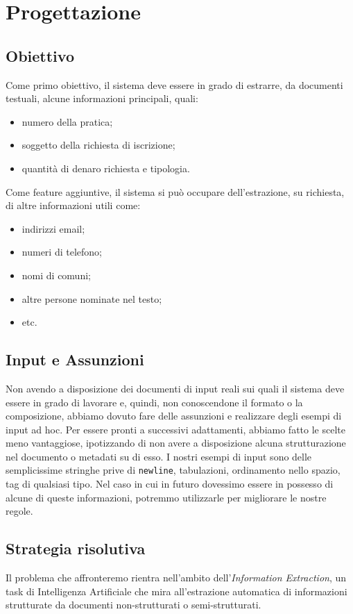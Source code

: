 \section{Progettazione}

\subsection{Obiettivo}
Come primo obiettivo, il sistema deve essere in grado di estrarre, da documenti testuali, alcune informazioni principali, quali:
\begin{itemize}
\item numero della pratica; %
\item soggetto della richiesta di iscrizione;
\item quantità di denaro richiesta e tipologia.
\end{itemize}

Come feature aggiuntive, il sistema si può occupare dell'estrazione, su richiesta, di altre informazioni utili come:
\begin{itemize}
\item indirizzi email;
\item numeri di telefono;
\item nomi di comuni;
\item altre persone nominate nel testo;
\item etc.
\end{itemize}


\subsection{Input e Assunzioni}
Non avendo a disposizione dei documenti di input reali sui quali il sistema deve essere in grado di lavorare e, quindi, non conoscendone il formato o la composizione, abbiamo dovuto fare delle assunzioni e realizzare degli esempi di input ad hoc.
Per essere pronti a successivi adattamenti, abbiamo fatto le scelte meno vantaggiose, ipotizzando di non avere a disposizione alcuna strutturazione nel documento o metadati su di esso.
I nostri esempi di input sono delle semplicissime stringhe prive di \verb+newline+, tabulazioni, ordinamento nello spazio, tag di qualsiasi tipo.
Nel caso in cui in futuro dovessimo essere in possesso di alcune di queste informazioni, potremmo utilizzarle per migliorare le nostre regole.


\subsection{Strategia risolutiva}
Il problema che affronteremo rientra nell'ambito dell'\emph{Information Extraction}, un task di Intelligenza Artificiale che mira all'estrazione automatica di informazioni strutturate da documenti non-strutturati o semi-strutturati.

